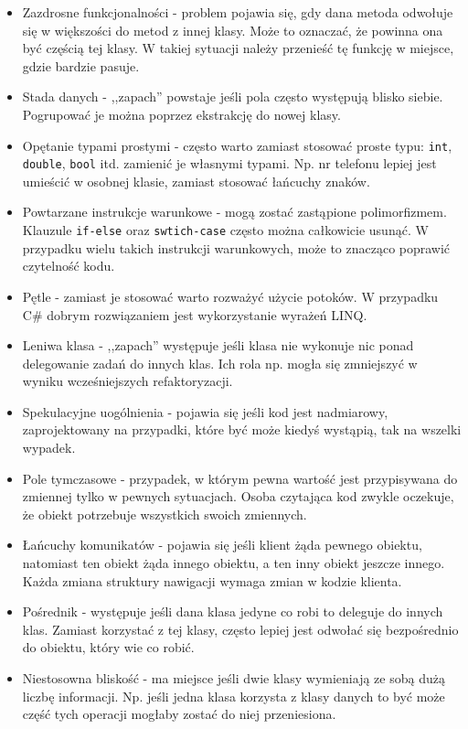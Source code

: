 \begin{itemize}
	\item Zazdrosne funkcjonalności - problem pojawia się, gdy dana metoda odwołuje się w większości do metod z innej klasy. Może to oznaczać, że powinna ona być częścią tej klasy. W takiej sytuacji należy przenieść tę funkcję w miejsce, gdzie bardzie pasuje.
	\item Stada danych - ,,zapach'' powstaje jeśli pola często występują blisko siebie. Pogrupować je można poprzez ekstrakcję do nowej klasy. 
	\item Opętanie typami prostymi - często warto zamiast stosować proste typu: \texttt{int}, \texttt{double}, \texttt{bool} itd. zamienić je własnymi typami. Np. nr telefonu lepiej jest umieścić w osobnej klasie, zamiast stosować łańcuchy znaków.
	\item Powtarzane instrukcje warunkowe - mogą zostać zastąpione polimorfizmem. Klauzule \texttt{if-else} oraz \texttt{swtich-case} często można całkowicie usunąć. W przypadku wielu takich instrukcji warunkowych, może to znacząco poprawić czytelność kodu.
	\item Pętle - zamiast je stosować warto rozważyć użycie potoków. W przypadku C\# dobrym rozwiązaniem jest wykorzystanie wyrażeń LINQ.
	\item Leniwa klasa - ,,zapach'' występuje jeśli klasa nie wykonuje nic ponad delegowanie zadań do innych klas. Ich rola np. mogła się zmniejszyć w wyniku wcześniejszych refaktoryzacji. 
	\item Spekulacyjne uogólnienia - pojawia się jeśli kod jest nadmiarowy, zaprojektowany na przypadki, które być może kiedyś wystąpią, tak na wszelki wypadek.
	\item Pole tymczasowe - przypadek, w którym pewna wartość jest przypisywana do zmiennej tylko w pewnych sytuacjach. Osoba czytająca kod zwykle oczekuje, że obiekt potrzebuje wszystkich swoich zmiennych.
	\item Łańcuchy komunikatów - pojawia się jeśli klient żąda pewnego obiektu, natomiast ten obiekt żąda innego obiektu, a ten inny obiekt jeszcze innego. Każda zmiana struktury nawigacji wymaga zmian w kodzie klienta.
	\item Pośrednik - występuje jeśli dana klasa jedyne co robi to deleguje do innych klas. Zamiast korzystać z tej klasy, często lepiej jest odwołać się bezpośrednio do obiektu, który wie co robić.
	\item Niestosowna bliskość - ma miejsce jeśli dwie klasy wymieniają ze sobą dużą liczbę informacji. Np. jeśli jedna klasa korzysta z klasy danych to być może część tych operacji mogłaby zostać do niej przeniesiona. 

\end{itemize}
